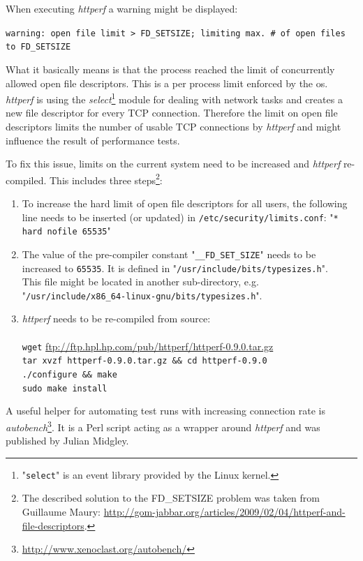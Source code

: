 When executing \textit{httperf} a warning might be displayed:

\texttt{warning: open file limit > FD\_SETSIZE; limiting max. \# of open files to FD\_SETSIZE}

What it basically means is that the process reached the limit of concurrently allowed open file descriptors. This is a per process limit enforced by the \gls{os}. \textit{httperf} is using the \textit{select}\footnote{"\texttt{select}" is an event library provided by the Linux kernel.} module for dealing with network tasks and creates a new file descriptor for every TCP connection. Therefore the limit on open file descriptors limits the number of usable TCP connections by \textit{httperf} and might influence the result of performance tests.

\clearpage
To fix this issue, limits on the current system need to be increased and \textit{httperf} re-compiled. This includes three steps\footnote{The described solution to the FD\_SETSIZE problem was taken from Guillaume Maury: \url{http://gom-jabbar.org/articles/2009/02/04/httperf-and-file-descriptors}.}:

\begin{enumerate}
\item To increase the hard limit of open file descriptors for all users, the following line needs to be inserted (or updated) in \texttt{/etc/security/limits.conf}: "\texttt{* hard nofile 65535}"

\item The value of the pre-compiler constant "\texttt{\_\_FD\_SET\_SIZE}" needs to be increased to \texttt{65535}. It is defined in "\texttt{/usr/include/bits/typesizes.h}". \\
This file might be located in another sub-directory, e.g. "\texttt{/usr/include/x86\_64-linux-gnu/bits/typesizes.h}".

\item \textit{httperf} needs to be re-compiled from source:\\
 \\
\texttt{wget} \url{ftp://ftp.hpl.hp.com/pub/httperf/httperf-0.9.0.tar.gz}\\
\texttt{tar xvzf httperf-0.9.0.tar.gz \&\& cd httperf-0.9.0\\
./configure \&\& make\\
sudo make install}
\end{enumerate}

A useful helper for automating test runs with increasing connection rate is \textit{autobench}\footnote{\url{http://www.xenoclast.org/autobench/}}. It is a Perl script acting as a wrapper around \textit{httperf} and was published by Julian Midgley.
\\

